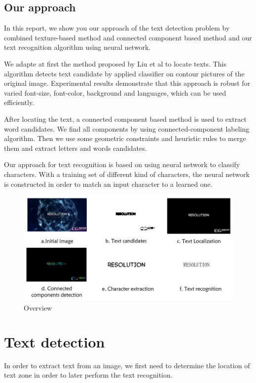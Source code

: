 \documentclass[paper=a4, french, 11pt]{scrartcl}
\begin{document}
\subsection{Our approach}
In this report, we show you our approach of the text detection problem by combined texture-based method and connected component based method and our text recognition algorithm using neural network. 

We adapte at first the method proposed by Liu et al \cite{liu2005text} to locate texts. This algorithm detects text candidate by applied classifier on contour pictures of the original image. Experimental results demonstrate that this approach is robust for varied font-size, font-color, background and languages, which can be used efficiently.

After locating the text, a connected component based method is used to extract word candidates. We find all components by using connected-component labeling algorithm. Then we use some geometric constraints and heuristic rules to merge them and extract letters and words candidates.  

Our approach for text recognition is based on using neural network to classify characters. With a training set of different kind of characters, the neural network is constructed in order to match an input character to a learned one. 


\begin{figure}[h]
\begin{center}
	\vspace{-1ex}
   \includegraphics[width=0.9\linewidth]{process.png}
\end{center}
\vspace{-4ex}
\caption{Overview}
\label{fig:heatmap}
\end{figure}

\section{Text detection}
In order to extract text from an image, we first need to determine the location of text zone in order to later perform the text recognition.  
\end{document}
